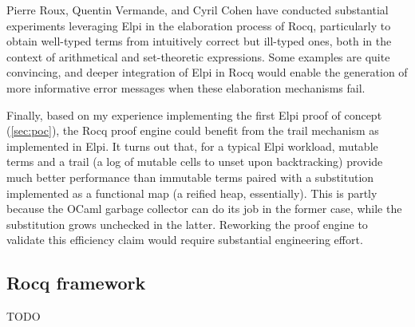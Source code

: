 \documentclass{these-ISSS}
\begin{document}
Pierre Roux, Quentin Vermande, and Cyril Cohen have conducted substantial
experiments leveraging Elpi in the elaboration process of Rocq, particularly to
obtain well-typed terms from intuitively correct but ill-typed ones, both in
the context of arithmetical and set-theoretic expressions. Some examples are
quite convincing, and deeper integration of Elpi in Rocq would enable the
generation of more informative error messages when these elaboration mechanisms
fail.

Finally, based on my experience implementing the first Elpi proof of
concept (\cref{sec:poc}), the Rocq proof engine could benefit from the trail
mechanism as implemented in Elpi. It turns out that, for a typical Elpi
workload, mutable terms and a trail (a log of mutable cells to unset upon
backtracking) provide much better performance than immutable terms paired with
a substitution implemented as a functional map (a reified heap, essentially).
This is partly because the OCaml garbage collector can do its job in the former
case, while the substitution grows unchecked in the latter. Reworking the proof
engine to validate this efficiency claim would require substantial engineering
effort.

\subsection{Rocq framework}

TODO

\backmatter

\printindex[concept]
\printbibliography[title={Our Bibliography}, keyword=me]
\printbibliography[title={Bibliography}, keyword=they]
\end{document}
